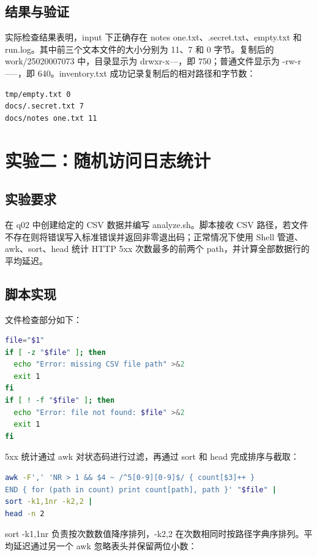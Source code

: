 \documentclass[UTF8]{ctexart}
\begin{document}
\subsection{结果与验证}

实际检查结果表明，input 下正确存在 notes one.txt、.secret.txt、empty.txt 和 run.log。其中前三个文本文件的大小分别为 11、7 和 0 字节。复制后的 work/25020007073 中，目录显示为 drwxr-x---，即 750；普通文件显示为 -rw-r-----，即 640。inventory.txt 成功记录复制后的相对路径和字节数：

\begin{lstlisting}
tmp/empty.txt 0
docs/.secret.txt 7
docs/notes one.txt 11
\end{lstlisting}

\section{实验二：随机访问日志统计}

\subsection{实验要求}

在 q02 中创建给定的 CSV 数据并编写 analyze.sh。脚本接收 CSV 路径，若文件不存在则将错误写入标准错误并返回非零退出码；正常情况下使用 Shell 管道、awk、sort、head 统计 HTTP 5xx 次数最多的前两个 path，并计算全部数据行的平均延迟。

\subsection{脚本实现}

文件检查部分如下：

\begin{lstlisting}[language=bash]
file="$1"
if [ -z "$file" ]; then
  echo "Error: missing CSV file path" >&2
  exit 1
fi
if [ ! -f "$file" ]; then
  echo "Error: file not found: $file" >&2
  exit 1
fi
\end{lstlisting}

5xx 统计通过 awk 对状态码进行过滤，再通过 sort 和 head 完成排序与截取：

\begin{lstlisting}[language=bash]
awk -F',' 'NR > 1 && $4 ~ /^5[0-9][0-9]$/ { count[$3]++ }
END { for (path in count) print count[path], path }' "$file" |
sort -k1,1nr -k2,2 |
head -n 2
\end{lstlisting}

sort -k1,1nr 负责按次数数值降序排列，-k2,2 在次数相同时按路径字典序排列。平均延迟通过另一个 awk 忽略表头并保留两位小数：
\end{document}
